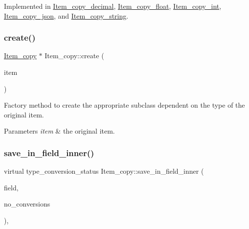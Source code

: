 Implemented in \mbox{\hyperlink{classItem__copy__decimal_a22459a6e13d4ab30f14818c9b0c65730}{Item\+\_\+copy\+\_\+decimal}}, \mbox{\hyperlink{classItem__copy__float_a33ef4acb20a062adcc037c1473f79bb0}{Item\+\_\+copy\+\_\+float}}, \mbox{\hyperlink{classItem__copy__int_adb454f84e2c727dfc8891347f51c4fae}{Item\+\_\+copy\+\_\+int}}, \mbox{\hyperlink{classItem__copy__json_a061528b6d05583ba76ecec780d4603f7}{Item\+\_\+copy\+\_\+json}}, and \mbox{\hyperlink{classItem__copy__string_a35d49a3dc996343f458a63d62e7bf776}{Item\+\_\+copy\+\_\+string}}.

\mbox{\label{classItem__copy_af6d92b94c26733316776b982dae9d8fe}} 
\subsubsection{\texorpdfstring{create()}{create()}}
{\footnotesize\ttfamily \mbox{\hyperlink{classItem__copy}{Item\+\_\+copy}} $\ast$ Item\+\_\+copy\+::create (\begin{DoxyParamCaption}\item[{\mbox{\hyperlink{classItem}{Item}} $\ast$}]{item }\end{DoxyParamCaption})\hspace{0.3cm}{\ttfamily [static]}}

Factory method to create the appropriate subclass dependent on the type of the original item.


\begin{DoxyParams}{Parameters}
{\em item} & the original item. \\
\hline
\end{DoxyParams}
\mbox{\label{classItem__copy_af4b55bf8c530188fa2110728a512811b}} 
\subsubsection{\texorpdfstring{save\+\_\+in\+\_\+field\+\_\+inner()}{save\_in\_field\_inner()}}
{\footnotesize\ttfamily virtual type\+\_\+conversion\+\_\+status Item\+\_\+copy\+::save\+\_\+in\+\_\+field\+\_\+inner (\begin{DoxyParamCaption}\item[{\mbox{\hyperlink{classField}{Field}} $\ast$}]{field,  }\item[{bool}]{no\+\_\+conversions }\end{DoxyParamCaption})\hspace{0.3cm}{\ttfamily [protected]}, {}}


